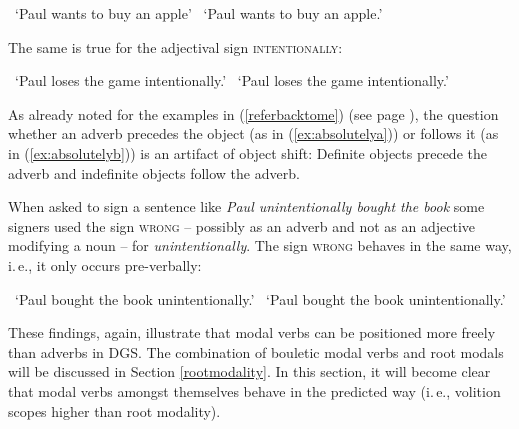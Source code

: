 \begin{exe}
\ex\begin{xlist} 
\glt \textcolor{white}{*}`Paul wants to buy an apple' \label{ex:absolutelya}
\glt \textcolor{white}{*}`Paul wants to buy an apple.'  \label{ex:absolutelyb}
\end{xlist}
\end{exe} 

\noindent The same is true for the adjectival sign \textsc{intentionally}:

\begin{exe}
\ex\begin{xlist} 
\glt \textcolor{white}{*}`Paul loses the game intentionally.' \label{ex:intentionallya}
\glt \textcolor{white}{*}`Paul loses the game intentionally.'  \label{ex:intentionallyb}
\end{xlist}
\end{exe} 

\noindent As already noted for the examples in (\ref{referbacktome}) (see page \pageref{referbacktome}), the question whether an adverb precedes the object (as in (\ref{ex:absolutelya})) or follows it (as in (\ref{ex:absolutelyb})) is an artifact of object shift: Definite objects precede the adverb and indefinite objects follow the adverb. 

When asked to sign a sentence like \textit{Paul unintentionally bought the book} some signers used the sign \textsc{wrong} -- possibly as an adverb and not as an adjective modifying a noun -- for \textit{unintentionally}. The sign \textsc{wrong} behaves in the same way, i.\,e., it only occurs pre-verbally:

\begin{exe}
\ex\begin{xlist} 
\glt \textcolor{white}{*}`Paul bought the book unintentionally.' \label{ex:intentionallya}
\glt \textcolor{white}{*}`Paul bought the book unintentionally.'  \label{ex:intentionallyb}
\end{xlist}
\end{exe} 

\noindent These findings, again, illustrate that modal verbs can be positioned more freely than adverbs in DGS. The combination of bouletic modal verbs and root modals will be discussed in Section \ref{rootmodality}. In this section, it will become clear that modal verbs amongst themselves behave in the predicted way (i.\,e., volition scopes higher than root modality). 

